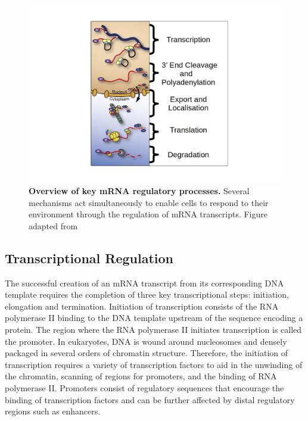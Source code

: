 \documentclass[../main.tex]{subfiles}
\begin{document}
\begin{figure}[h]

{\centering \includegraphics[width=\linewidth]{figures/post-transcriptional-regulation} 

}

\caption[Overview of key mRNA regulatory processes.]{\textbf{Overview of key mRNA regulatory processes.} Several mechanisms act simultaneously to enable cells to respond to their environment through the regulation of mRNA transcripts. Figure adapted from \cite{Corbett2018}}\label{fig:mrna-regulation}
\end{figure}


\subsection{Transcriptional Regulation}

The successful creation of an mRNA transcript from its corresponding DNA template requires the completion of three key transcriptional steps: initiation, elongation and termination.
Initiation of transcription consists of the RNA polymerase II binding to the DNA template upstream of the sequence encoding a protein.
The region where the RNA polymerase II initiates transcription is called the promoter.
In eukaryotes, DNA is wound around nucleosomes and densely packaged in several orders of chromatin structure.
Therefore, the initiation of transcription requires a variety of transcription factors to aid in the unwinding of the chromatin, scanning of regions for promoters, and the binding of RNA polymerase II.
Promoters consist of regulatory sequences that encourage the binding of transcription factors and can be further affected by distal regulatory regions such as enhancers. 
\end{document}
